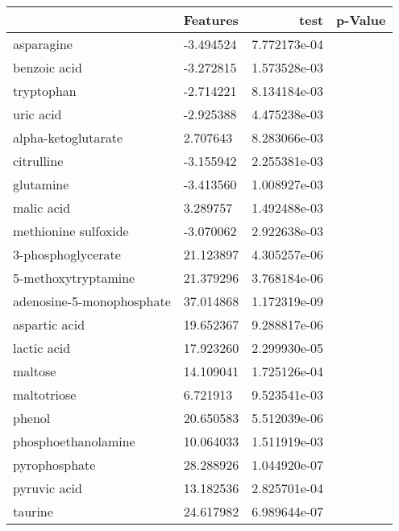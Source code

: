 \begin{tabular}{llrr}
\toprule
{} &                   Features &       test &       p-Value \\
\midrule
asparagine &  -3.494524 &  7.772173e-04 \\
benzoic acid &  -3.272815 &  1.573528e-03 \\
tryptophan &  -2.714221 &  8.134184e-03 \\
uric acid &  -2.925388 &  4.475238e-03 \\
alpha-ketoglutarate &   2.707643 &  8.283066e-03 \\
citrulline &  -3.155942 &  2.255381e-03 \\
glutamine &  -3.413560 &  1.008927e-03 \\
malic acid &   3.289757 &  1.492488e-03 \\
methionine sulfoxide &  -3.070062 &  2.922638e-03 \\
3-phosphoglycerate &  21.123897 &  4.305257e-06 \\
5-methoxytryptamine &  21.379296 &  3.768184e-06 \\
adenosine-5-monophosphate &  37.014868 &  1.172319e-09 \\
aspartic acid &  19.652367 &  9.288817e-06 \\
lactic acid &  17.923260 &  2.299930e-05 \\
maltose &  14.109041 &  1.725126e-04 \\
maltotriose &   6.721913 &  9.523541e-03 \\
phenol &  20.650583 &  5.512039e-06 \\
phosphoethanolamine &  10.064033 &  1.511919e-03 \\
pyrophosphate &  28.288926 &  1.044920e-07 \\
pyruvic acid &  13.182536 &  2.825701e-04 \\
taurine &  24.617982 &  6.989644e-07 \\
\bottomrule
\end{tabular}
